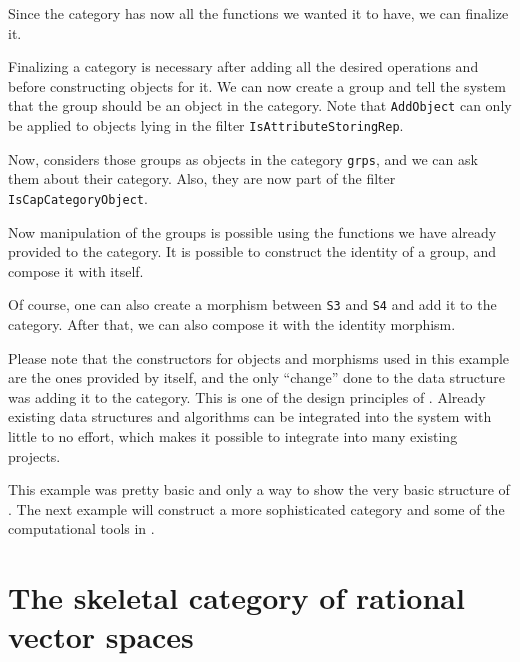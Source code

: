 

Since the category has now all the functions we wanted it to have, we can finalize it.



Finalizing a category is necessary after adding all the desired operations and before constructing objects
for it. We can now create a group and tell the system that the group should be an object in the category.
Note that \texttt{AddObject} can only be applied to \GAP objects lying in the filter
\texttt{IsAttributeStoringRep}.



Now, \CapPkg considers those groups as objects in the category \texttt{grps}, and we can
ask them about their category. Also, they are now part of the \GAP filter \texttt{IsCapCategoryObject}.



Now manipulation of the groups is possible using the functions we have already provided to the category.
It is possible to construct the identity of a group, and compose it with itself.



Of course, one can also create a morphism between \texttt{S3} and \texttt{S4} and add it to the category.
After that, we can also compose it with the identity morphism.



Please note that the constructors for objects and morphisms used in this example are the ones provided
by \GAP itself, and the only ``change'' done to the data structure was adding it to the category.
This is one of the design principles of \CapPkg. Already existing data structures and algorithms
can be integrated into the system with little to no effort, which makes it possible to integrate \CapPkg
into many existing projects.

This example was pretty basic and only a way to show the very basic structure of \CapPkg. The next example
will construct a more sophisticated category and some of the computational tools in \CapPkg.


\section{The skeletal category of rational vector spaces}

